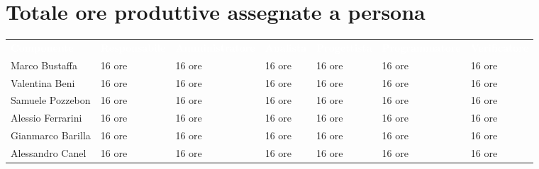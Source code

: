 \section{Totale ore produttive assegnate a persona}
{\renewcommand{\arraystretch}{1.5}
\scriptsize
\begin{tabular}{p{2.5cm}p{2cm}p{2.3cm}p{1.3cm}p{2cm}p{2.3cm}p{2cm}}
	\rowcolor[RGB]{33, 73, 50}
	\textcolor{white}{\textbf{Componente}} & \textcolor{white}{\textbf{Responsabile}} & \textcolor{white}
	{\textbf{Amministratore}} & \textcolor{white}{\textbf{Analista}} & \textcolor{white}
	{\textbf{Progettista}} & \textcolor{white}{\textbf{Programmatore}} 
	& \textcolor{white}{\textbf{Verificatore}} \\
	\rowcolor[RGB]{216, 235, 171}
	Marco Bustaffa & 16 ore & 16 ore & 16 ore & 16 ore & 16 ore & 16 ore        \\
	\rowcolor[RGB]{233, 245, 206}
	Valentina Beni & 16 ore & 16 ore & 16 ore & 16 ore & 16 ore & 16 ore        \\
	\rowcolor[RGB]{216, 235, 171}
	Samuele Pozzebon & 16 ore & 16 ore & 16 ore & 16 ore & 16 ore & 16 ore      \\
    \rowcolor[RGB]{233, 245, 206}
	Alessio Ferrarini & 16 ore & 16 ore & 16 ore & 16 ore & 16 ore & 16 ore     \\
    \rowcolor[RGB]{216, 235, 171}
	Gianmarco Barilla & 16 ore & 16 ore & 16 ore & 16 ore & 16 ore & 16 ore     \\
    \rowcolor[RGB]{233, 245, 206}
	Alessandro Canel & 16 ore & 16 ore & 16 ore & 16 ore & 16 ore & 16 ore    	\\
\end{tabular}	
}